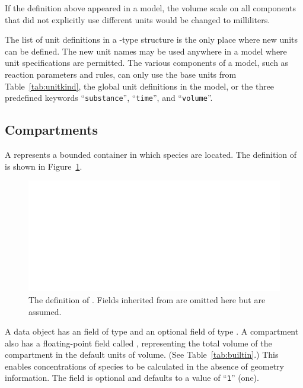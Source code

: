 \documentclass[10pt,twocolumntoc]{cekarticle}
\newcommand{\vref}[1]{\ref{#1}}
\begin{document}
If the definition above appeared in a model, the volume scale on all
components that did not explicitly use different units would be changed to
milliliters.

The list of unit definitions in a -type structure is the only
place where new units can be defined.  The new unit names may be used
anywhere in a model where unit specifications are permitted.  The various
components of a model, such as reaction parameters and rules, can only use
the base units from Table~\ref{tab:unitkind}, the global unit definitions
in the model, or the three predefined keywords ``\texttt{substance}'',
``\texttt{time}'', and ``\texttt{volume}''.

\subsection{Compartments}
\label{sec:compartments}

A  represents a bounded container in which
species are located.  The definition of  is
shown in Figure~\vref{fig:compartment}.

\begin{figure}[htb]
  \vspace*{12pt}                        %
  \centering
  \includegraphics[scale = 0.68]{compartment}
  \caption{The definition of .
    Fields inherited from  are omitted here but are assumed.}
  \label{fig:compartment}
\end{figure}

A  data object has an  field of type
 and an optional  field of type
.  A compartment also has a floating-point field
called , representing the total volume of the
compartment in the default units of volume.  (See
Table~\vref{tab:builtin}.)  This enables concentrations of species
to be calculated in the absence of geometry information. The
 field is optional and defaults to a value of
``\texttt{1}'' (one).
\end{document}
